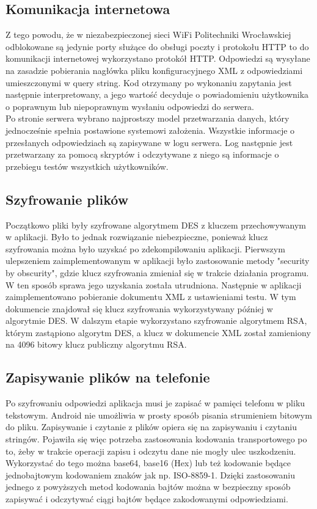\documentclass[eng]{mgr}
\begin{document}
			\subsection{Komunikacja internetowa}
			
			Z tego powodu, że w niezabezpieczonej sieci WiFi Politechniki Wrocławskiej odblokowane są jedynie porty służące do obsługi poczty i protokołu HTTP to do komunikacji internetowej wykorzystano protokół HTTP. Odpowiedzi są wysyłane na zasadzie pobierania nagłówka pliku konfiguracyjnego XML z odpowiedziami umieszczonymi w query string. Kod otrzymany po wykonaniu zapytania jest następnie interpretowany, a jego wartość decyduje o powiadomieniu użytkownika o poprawnym lub niepoprawnym wysłaniu odpowiedzi do serwera.\\
			
			Po stronie serwera wybrano najprostszy model przetwarzania danych, który jednocześnie spełnia postawione systemowi założenia. Wszystkie informacje o przesłanych odpowiedziach są zapisywane w logu serwera. Log następnie jest przetwarzany za pomocą skryptów i odczytywane z niego są informacje o przebiegu testów wszystkich użytkowników.
		
			\subsection{Szyfrowanie plików}
		
			Początkowo pliki były szyfrowane algorytmem DES z kluczem przechowywanym w aplikacji. Było to jednak rozwiązanie niebezpieczne, ponieważ klucz szyfrowania można było uzyskać po zdekompilowaniu aplikacji. Pierwszym ulepszeniem zaimplementowanym w aplikacji było zastosowanie metody "security by obscurity", gdzie klucz szyfrowania zmieniał się w trakcie działania programu. W ten sposób sprawa jego uzyskania została utrudniona. Następnie w aplikacji zaimplementowano pobieranie dokumentu XML z ustawieniami testu. W tym dokumencie znajdował się klucz szyfrowania wykorzystywany później w algorytmie DES. W dalszym etapie wykorzystano szyfrowanie algorytmem RSA, którym zastąpiono algorytm DES, a klucz w dokumencie XML został zamieniony na 4096 bitowy klucz publiczny algorytmu RSA.
			
			\subsection{Zapisywanie plików na telefonie}
			
			Po szyfrowaniu odpowiedzi aplikacja musi je zapisać w pamięci telefonu w pliku tekstowym. Android nie umożliwia w prosty sposób pisania strumieniem bitowym do pliku. Zapisywanie i czytanie z plików opiera się na zapisywaniu i czytaniu stringów. Pojawiła się więc potrzeba zastosowania kodowania transportowego po to, żeby w trakcie operacji zapisu i odczytu dane nie mogły ulec uszkodzeniu. Wykorzystać do tego można base64, base16 (Hex) lub też kodowanie będące jednobajtowym kodowaniem znaków jak np. ISO-8859-1. Dzięki zastosowaniu jednego z powyższych metod kodowania bajtów można w bezpieczny sposób zapisywać i odczytywać ciągi bajtów będące zakodowanymi odpowiedziami.
		
\end{document}
